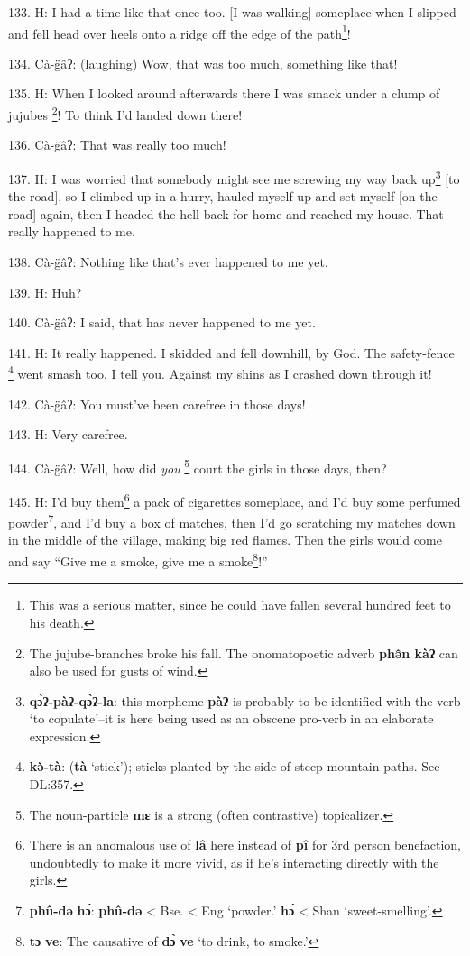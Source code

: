 133. H: I had a time like that once too. [I was walking] someplace when I slipped
and fell head over heels onto a ridge off the edge of the path\footnote{This was a serious matter, since he could have fallen several hundred feet to his death.}!

134. Cà-g̈âʔ: (laughing) Wow, that was too much, something like that!

135. H: When I looked around afterwards there I was smack under a clump of jujubes
\footnote{The jujube-branches broke his fall. The onomatopoetic adverb \textbf{phə̂n kàʔ} can also be used for gusts of wind.}! To think I'd landed down there!

136. Cà-g̈âʔ: That was really too much!

137. H: I was worried that somebody might see me screwing my way back up\footnote{\textbf{qɔ̀ʔ-pàʔ-qɔ̀ʔ-la}: this morpheme \textbf{pàʔ} is probably to be identified with the verb `to copulate'--it is here being used as an obscene pro-verb in an elaborate expression.} [to
the road], so I climbed up in a hurry, hauled myself up and set myself [on the
road] again, then I headed the hell back for home and reached my house. That really
happened to me.

138. Cà-g̈âʔ: Nothing like that's ever happened to me yet.

139. H: Huh?

140. Cà-g̈âʔ: I said, that has never happened to me yet.

141. H: It really happened. I skidded and fell downhill, by God. The safety-fence
\footnote{\textbf{kə̀-tà}: (\textbf{tà} `stick'); sticks planted by the side of steep mountain paths. See DL:357.} went smash too, I tell you. Against my shins as I crashed down through it!

142. Cà-g̈âʔ: You must've been carefree in those days!

143. H: Very carefree.

144. Cà-g̈âʔ: Well, how did \textit{you }\footnote{The noun-particle \textbf{mɛ} is a strong (often contrastive) topicalizer.} court the girls in those days,
then?

145. H: I'd buy them\footnote{There is an anomalous use of \textbf{lâ} here instead of \textbf{pî} for 3rd person benefaction, undoubtedly to make it more vivid, as if he's interacting directly with the girls.} a pack of cigarettes someplace, and I'd buy some perfumed
powder\footnote{\textbf{phû-də} \textbf{hɔ́}: \textbf{phû-də} < Bse. < Eng `powder.' \textbf{hɔ́} < Shan `sweet-smelling'.}, and I'd buy a box of matches, then I'd go scratching my matches down
in the middle of the village, making big red flames. Then the girls would come
and say ``Give me a smoke, give me a smoke\footnote{\textbf{tɔ} \textbf{ve}: The causative of \textbf{dɔ̀} \textbf{ve} `to drink, to smoke.'}!''

